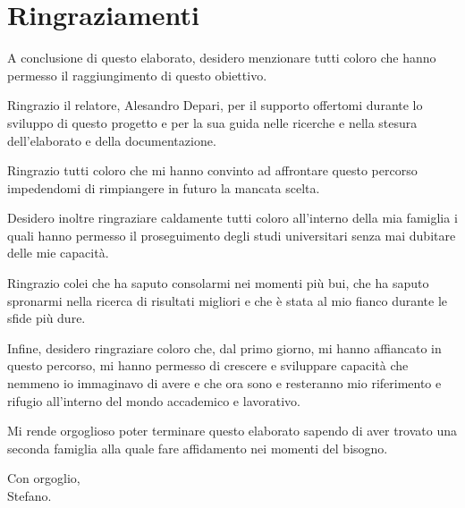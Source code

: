 \chapter*{Ringraziamenti}

A conclusione di questo elaborato, desidero menzionare tutti coloro che hanno permesso il raggiungimento di questo obiettivo.

Ringrazio il relatore, Alesandro Depari, per il supporto offertomi durante lo sviluppo di questo progetto e per la sua guida nelle ricerche e nella stesura dell'elaborato e della documentazione.

Ringrazio tutti coloro che mi hanno convinto ad affrontare questo percorso impedendomi di rimpiangere in futuro la mancata scelta.

Desidero inoltre ringraziare caldamente tutti coloro all'interno della mia famiglia i quali hanno permesso il proseguimento degli studi universitari senza mai dubitare delle mie capacità.

Ringrazio colei che ha saputo consolarmi nei momenti più bui, che ha saputo spronarmi nella ricerca di risultati migliori e che è stata al mio fianco durante le sfide più dure.

Infine, desidero ringraziare coloro che, dal primo giorno, mi hanno affiancato in questo percorso, mi hanno permesso di crescere e sviluppare capacità che nemmeno io immaginavo di avere e che ora sono e resteranno mio riferimento e rifugio all'interno del mondo accademico e lavorativo.

Mi rende orgoglioso poter terminare questo elaborato sapendo di aver trovato una seconda famiglia alla quale fare affidamento nei momenti del bisogno.

\vfill

{\setlength{\parindent}{0cm}
Con orgoglio,\\
Stefano.
}